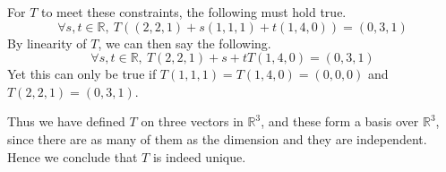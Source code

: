 \documentclass{article}
\newenvironment{answers}{ %
	\begin{enumerate}
		\setlength{\itemsep}{\bigskipamount}
}{\end{enumerate}}
\newcommand{\R}{\mathbb{R}}
\begin{document}
\begin{answers}
\begin{enumerate}
				For \(T\) to meet these constraints, the following must hold true.
				\begin{equation*}
					\forall s,t \in \R,\ T((2,2,1) + s(1,1,1) + t(1,4,0)) = (0,3,1)
				\end{equation*}
				By linearity of \(T\), we can then say the following.
				\begin{equation*}
					\forall s,t \in \R,\ T(2,2,1) + s + tT(1,4,0) = (0,3,1)
				\end{equation*}
				Yet this can only be true if \(T(1,1,1) = T(1,4,0) = (0,0,0)\) and \(T(2,2,1) = (0,3,1)\).

				Thus we have defined \(T\) on three vectors in \(\R^3\), and these form a basis over \(\R^3\), since there are as many of them as the dimension and they are independent. Hence we conclude that \(T\) is indeed unique.
		\end{enumerate}
\end{answers}
\end{document}
